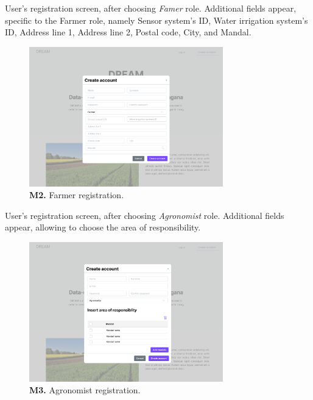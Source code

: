 User's registration screen, after choosing \textit{Famer} role. Additional fields appear, specific to the Farmer role, namely Sensor system's ID, Water irrigation system's ID, Address line 1, Address line 2, Postal code, City, and Mandal.
\begin{figure}[H]
    \centering
    \includegraphics[width=0.75\textwidth]{mockups/Unreg. user_Create account_Farmer.png}
    \caption{\textbf{M2.} Farmer registration.}
    \label{fig:farmer-create-account}
\end{figure}

User's registration screen, after choosing \textit{Agronomist} role. Additional fields appear, allowing to choose the area of responsibility.
\begin{figure}[H]
    \centering
    \includegraphics[width=0.75\textwidth]{mockups/Unreg. user_Create account_Agronomist.png}
    \caption{\textbf{M3.} Agronomist registration.}
    \label{fig:agronomist-create-account}
\end{figure}

